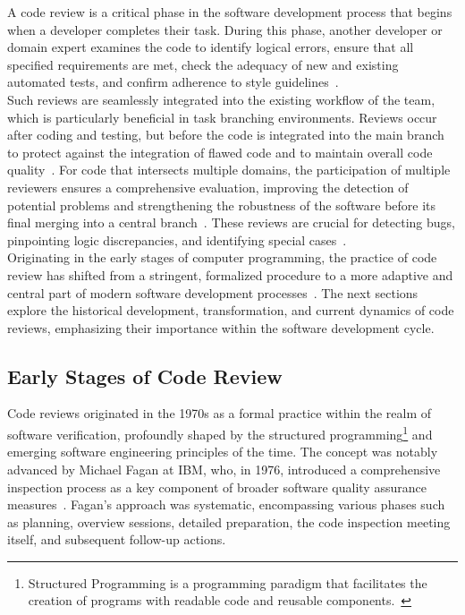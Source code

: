 A code review is a critical phase in the software development process that begins when a developer completes their task. During this phase, another developer or domain expert examines the code to identify logical errors, ensure that all specified requirements are met, check the adequacy of new and existing automated tests, and confirm adherence to style guidelines~\cite{atlassian_What_is_a_code_review, Expectations_outcomes, sadowski_google}.\\

Such reviews are seamlessly integrated into the existing workflow of the team, which is particularly beneficial in task branching environments. Reviews occur after coding and testing, but before the code is integrated into the main branch to protect against the integration of flawed code and to maintain overall code quality~\cite{atlassian_What_is_a_code_review}. For code that intersects multiple domains, the participation of multiple reviewers ensures a comprehensive evaluation, improving the detection of potential problems and strengthening the robustness of the software before its final merging into a central branch~\cite{gitlab_What_is_a_code_review?}. These reviews are crucial for detecting bugs, pinpointing logic discrepancies, and identifying special cases~\cite{Expectations_outcomes}. \\

Originating in the early stages of computer programming, the practice of code review has shifted from a stringent, formalized procedure to a more adaptive and central part of modern software development processes~\cite{Wang_evolution}. The next sections explore the historical development, transformation, and current dynamics of code reviews, emphasizing their importance within the software development cycle.

\subsection{Early Stages of Code Review}
Code reviews originated in the 1970s as a formal practice within the realm of software verification, profoundly shaped by the structured programming\footnote{Structured Programming is a programming paradigm that facilitates the creation of programs with readable code and reusable components.~\cite{What_is_Structured_Programming?}} and emerging software engineering principles of the time. The concept was notably advanced by Michael Fagan at IBM, who, in 1976, introduced a comprehensive inspection process as a key component of broader software quality assurance measures~\cite{sadowski_google, Fagan}. Fagan's approach was systematic, encompassing various phases such as planning, overview sessions, detailed preparation, the code inspection meeting itself, and subsequent follow-up actions.\\

